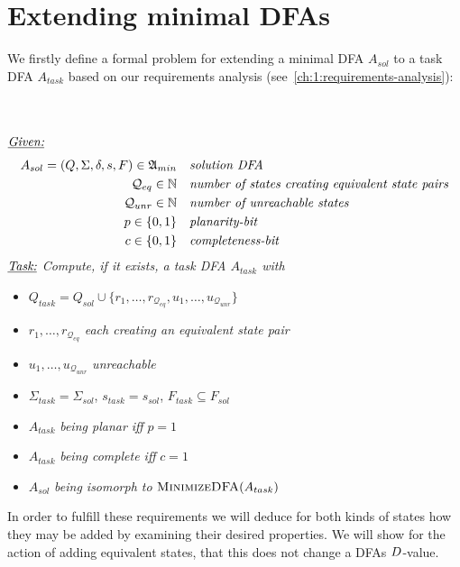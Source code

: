 
\chapter{Extending minimal DFAs} \label{ch:3}

We firstly define a formal problem for extending a minimal DFA $A_{sol}$ to a task DFA $A_{task}$ based on our requirements analysis (see~\ref{ch:1:requirements-analysis}):
\begin{definition}[ExtendMinimalDFA] $ $ \\
	$ $ \vspace{-0.cm} \\
	\noindent $\underline{\emph{Given:}}$
	\vspace{-0.2cm}
	\begin{align*}
	A_{sol} = (Q, \Sigma, \delta, s, F) \in \mathfrak{A}_{min}\ \ \ & \emph{solution DFA} \\
	\mathcal{Q}_{eq} \in \mathbb{N}\ \ \ & \emph{number of states creating equivalent state pairs} \\
	\mathcal{Q}_{unr} \in \mathbb{N}\ \ \ & \emph{number of unreachable states} \\
	p \in \{0,1\}\ \ \ & \emph{planarity-bit} \\
	c \in \{0,1\}\ \ \ & \emph{completeness-bit}
	\end{align*}
	\noindent $\underline{\emph{Task:}}$ \emph{Compute, if it exists, a task DFA $A_{task}$ with}
	\begin{itemize}
		\item $Q_{task} = Q_{sol} \cup \{ r_1, \ldots, r_{\mathcal{Q}_{eq}}, u_1, \ldots, u_{\mathcal{Q}_{unr}} \}$
		\item $r_1, \ldots, r_{\mathcal{Q}_{eq}}$ \emph{each creating an equivalent state pair}
		\item $u_1, \ldots, u_{\mathcal{Q}_{unr}}$ \emph{unreachable}
		\item $\Sigma_{task} = \Sigma_{sol}$, $s_{task} = s_{sol}$, $F_{task} \subseteq F_{sol}$
		\item $A_{task}$ \emph{being planar iff} $p = 1$
		\item $A_{task}$ \emph{being complete iff} $c = 1$
		\item $A_{sol}$ \emph{being isomorph to} $\textsc{MinimizeDFA}(A_{task})$
	\end{itemize}
\end{definition}
\noindent In order to fulfill these requirements we will deduce for both kinds of states how they may be added by examining their desired properties. We will show for the action of adding equivalent states, that this does not change a DFAs $D$-value.

